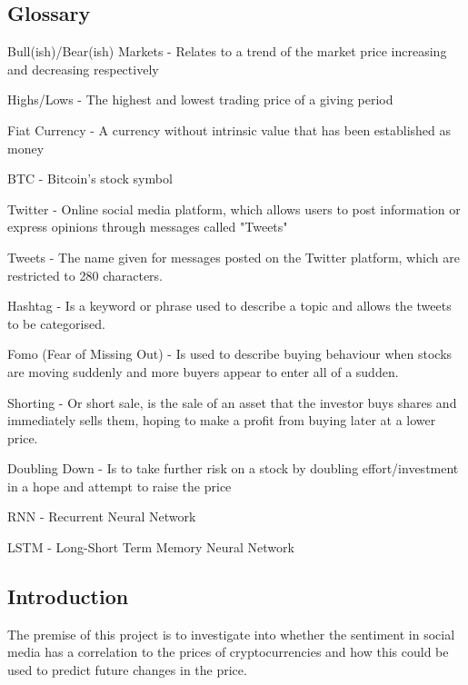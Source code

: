 \documentclass[oneside, 10pt]{article}
\begin{document}
	\newpage
	\begin{center}
		\section{Glossary}\label{glossary}
	\end{center}
	Bull(ish)/Bear(ish) Markets - Relates to a trend of the market price increasing and decreasing respectively
	
	Highs/Lows - The highest and lowest trading price of a giving period
	
	Fiat Currency - A currency without intrinsic value that has been established as money
	
	BTC - Bitcoin's stock symbol
	
	Twitter - Online social media platform, which allows users to post information or express opinions through messages called "Tweets"
	
	Tweets - The name given for messages posted on the Twitter platform, which are restricted to 280 characters.
	
	Hashtag - Is a keyword or phrase used to describe a topic and allows the tweets to be categorised.
	
	Fomo (Fear of Missing Out) - Is used to describe buying behaviour when stocks are moving suddenly and more buyers appear to enter all of a sudden.
	
	Shorting - Or short sale, is the sale of an asset that the investor buys shares and immediately sells them, hoping to make a profit from buying later at a lower price.
	
	Doubling Down - Is to take further risk on a stock by doubling effort/investment in a hope and attempt to raise the price
	
	RNN - Recurrent Neural Network
	
	LSTM - Long-Short Term Memory Neural Network
	
	\newpage
	
	\begin{center}
		\tableofcontents
	\end{center}
	
	\newpage
	\begin{center}
		\section{Introduction}\label{introduction}
	\end{center}
	The premise of this project is to investigate into whether the sentiment in social media has a correlation to the prices of cryptocurrencies and how this could be used to predict future changes in the price. 
	
\end{document}
